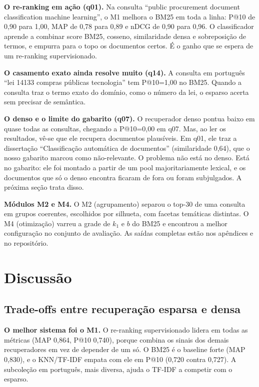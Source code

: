 \documentclass[12pt]{article}
\begin{document}
\textbf{O re-ranking em ação (q01).} Na consulta ``public procurement document classification machine learning'', o M1 melhora o BM25 em toda a linha: P@10 de 0,90 para 1,00, MAP de 0,78 para 0,89 e nDCG de 0,90 para 0,96. O classificador aprende a combinar score BM25, cosseno, similaridade densa e sobreposição de termos, e empurra para o topo os documentos certos. É o ganho que se espera de um re-ranking supervisionado.

\textbf{O casamento exato ainda resolve muito (q14).} A consulta em português ``lei 14133 compras públicas tecnologia'' tem P@10=1,00 no BM25. Quando a consulta traz o termo exato do domínio, como o número da lei, o esparso acerta sem precisar de semântica.

\textbf{O denso e o limite do gabarito (q07).} O recuperador denso pontua baixo em quase todas as consultas, chegando a P@10=0,00 em q07. Mas, ao ler os resultados, vê-se que ele recupera documentos plausíveis. Em q01, ele traz a dissertação ``Classificação automática de documentos'' (similaridade 0,64), que o nosso gabarito marcou como não-relevante. O problema não está no denso. Está no gabarito: ele foi montado a partir de um pool majoritariamente lexical, e os documentos que só o denso encontra ficaram de fora ou foram subjulgados. A próxima seção trata disso.

\textbf{Módulos M2 e M4.} O M2 (agrupamento) separou o top-30 de uma consulta em grupos coerentes, escolhidos por silhueta, com facetas temáticas distintas. O M4 (otimização) varreu a grade de $k_1$ e $b$ do BM25 e encontrou a melhor configuração no conjunto de avaliação. As saídas completas estão nos apêndices e no repositório.

\section{Discussão}

\subsection{Trade-offs entre recuperação esparsa e densa}

\textbf{O melhor sistema foi o M1.} O re-ranking supervisionado lidera em todas as métricas (MAP 0,864, P@10 0,740), porque combina os sinais dos demais recuperadores em vez de depender de um só. O BM25 é o baseline forte (MAP 0,830), e o KNN/TF-IDF empata com ele em P@10 (0,720 contra 0,727). A subcoleção em português, mais diversa, ajuda o TF-IDF a competir com o esparso.
\end{document}
